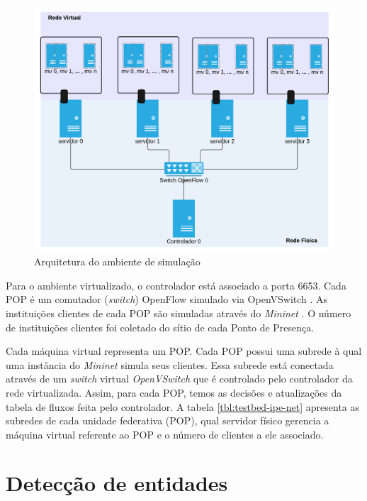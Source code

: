\begin{figure}[!h]
    \centering
    \label{fig:physical-vs-virtual-network}
    \includegraphics[width=\textwidth]{img/physical-vs-virtual-network-pt}
    \caption{Arquitetura do ambiente de simulação}
\end{figure}

Para o ambiente virtualizado, o controlador está associado a porta 6653.
Cada POP é um comutador (\emph{switch}) OpenFlow simulado via OpenVSwitch
\citep{openvswitch2015switch}.
As instituições clientes de cada POP são simuladas através do \emph{Mininet} 
\citep{lantz2010network}.
O número de instituições clientes foi coletado do sítio de cada Ponto de 
Presença.

Cada máquina virtual representa um POP.
Cada POP possui uma subrede à qual uma instância do \emph{Mininet} simula 
seus clientes. 
Essa subrede está conectada através de um \emph{switch} virtual 
\emph{OpenVSwitch} que é controlado pelo controlador da rede virtualizada.
Assim, para cada POP, temos as decisões e atualizações da tabela de fluxos
feita pelo controlador.
A tabela \ref{tbl:testbed-ipe-net} apresenta as subredes de cada unidade
federativa (POP), qual servidor físico gerencia a máquina virtual referente
ao POP e o número de clientes a ele associado.



\section{Detecção de entidades}

